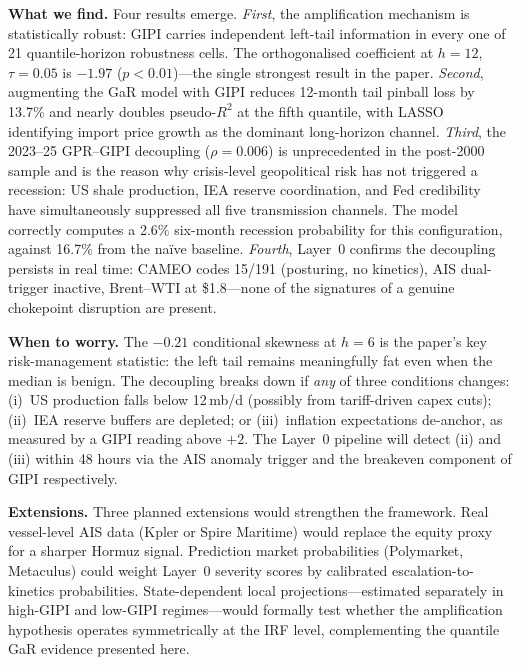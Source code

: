 \documentclass[12pt]{article}
\begin{document}
\noindent\textbf{What we find.}
Four results emerge.
\textit{First}, the amplification mechanism is statistically robust:
GIPI carries independent left-tail information in every one of 21
quantile-horizon robustness cells.
The orthogonalised coefficient at $h=12$, $\tau=0.05$ is $-1.97$
($p<0.01$)---the single strongest result in the paper.
\textit{Second}, augmenting the \citet{adrian2019} GaR model with GIPI
reduces 12-month tail pinball loss by 13.7\% and nearly doubles
pseudo-$R^2$ at the fifth quantile, with LASSO identifying import
price growth as the dominant long-horizon channel.
\textit{Third}, the 2023--25 GPR--GIPI decoupling ($\rho=0.006$) is
unprecedented in the post-2000 sample and is the reason why crisis-level
geopolitical risk has not triggered a recession: US shale production,
IEA reserve coordination, and Fed credibility have simultaneously
suppressed all five transmission channels.
The model correctly computes a 2.6\% six-month recession probability for
this configuration, against 16.7\% from the na\"ive baseline.
\textit{Fourth}, Layer~0 confirms the decoupling persists in real time:
CAMEO codes 15/191 (posturing, no kinetics), AIS dual-trigger inactive,
Brent--WTI at \$1.8---none of the signatures of a genuine chokepoint
disruption are present.

\noindent\textbf{When to worry.}
The $-0.21$ conditional skewness at $h=6$ is the paper's key risk-management
statistic: the left tail remains meaningfully fat even when the median is
benign.
The decoupling breaks down if \textit{any} of three conditions changes:
(i)~US production falls below 12\,mb/d (possibly from tariff-driven capex
cuts); (ii)~IEA reserve buffers are depleted; or (iii)~inflation expectations
de-anchor, as measured by a GIPI reading above $+2$.
The Layer~0 pipeline will detect (ii) and (iii) within 48 hours via the AIS
anomaly trigger and the breakeven component of GIPI respectively.

\noindent\textbf{Extensions.}
Three planned extensions would strengthen the framework.
Real vessel-level AIS data (Kpler or Spire Maritime) would replace the
equity proxy for a sharper Hormuz signal.
Prediction market probabilities (Polymarket, Metaculus) could weight
Layer~0 severity scores by calibrated escalation-to-kinetics probabilities.
State-dependent local projections---estimated separately in high-GIPI
and low-GIPI regimes---would formally test whether the amplification
hypothesis operates symmetrically at the IRF level, complementing the
quantile GaR evidence presented here.
\end{document}
